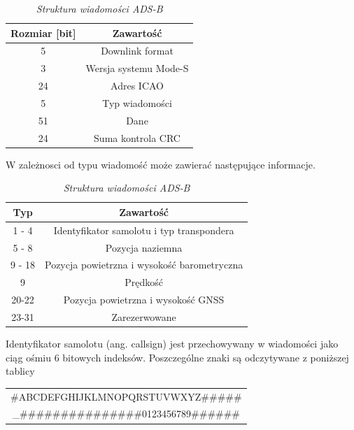 \documentclass[eng,printmode]{mgr}
\begin{document}
\begin{table}[htb]
\def\arraystretch{1.3}%
\caption{\textit{ Struktura wiadomości ADS-B}}
\label{tab:adsbFrame}
\begin{center}
\begin{tabular}{ |c|c| }
\hline
Rozmiar [bit] & Zawartość\\
\hline
5 & Downlink format\\
\hline
3 & Wersja systemu Mode-S\\
\hline
24 & Adres ICAO\\
\hline
5 & Typ wiadomości\\
\hline
51 & Dane\\
\hline
24 & Suma kontrola CRC\\
\hline
\end{tabular}
\end{center}
\end{table}
\noindent
W zależnosci od typu wiadomość może zawierać następujące informacje.

\begin{table}[htb]
\def\arraystretch{1.3}%
\caption{\textit{ Struktura wiadomości ADS-B}}
\label{tab:adsbFrame}
\begin{center}
\begin{tabular}{ |c|c| }
\hline
Typ & Zawartość\\
\hline
1 - 4 & Identyfikator samolotu i typ transpondera\\
\hline
5 - 8 & Pozycja naziemna\\
\hline
9 - 18 &  Pozycja powietrzna i wysokość barometryczna\\
\hline
9 & Prędkość\\
\hline
20-22 &  Pozycja powietrzna i wysokość GNSS\\
\hline
23-31 & Zarezerwowane\\
\hline
\end{tabular}
\end{center}
\end{table}

\newpage
Identyfikator samolotu (ang. callsign) jest przechowywany w wiadomości jako ciąg ośmiu 6 bitowych indeksów. Poszczególne znaki są odczytywane z poniższej tablicy 

\begin{table}[htb]
\label{tab:adsb}
  \centering
  \def\arraystretch{1.3}%
  \begin{tabular}{c}
       \#ABCDEFGHIJKLMNOPQRSTUVWXYZ\#\#\#\#\#\\
\_\#\#\#\#\#\#\#\#\#\#\#\#\#\#\#0123456789\#\#\#\#\#\#
 \end{tabular}
\end{table}
\end{document}
